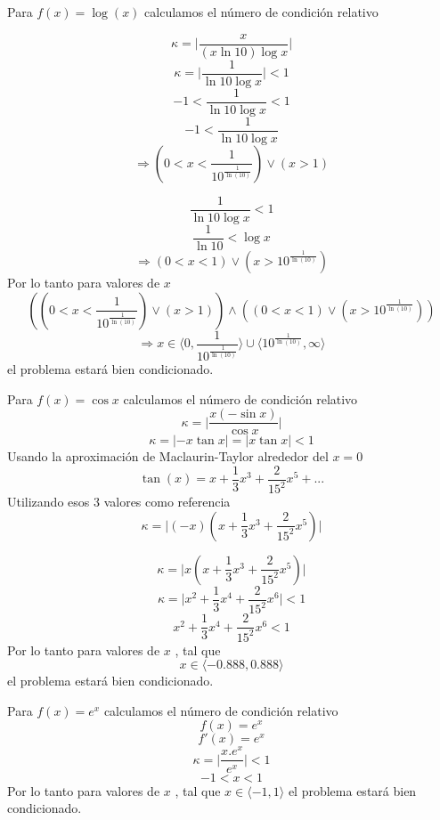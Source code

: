 \documentclass[10pts]{beamer}
\begin{document}
Para $f(x) = \log(x)$ calculamos el número de condición relativo

    \[\kappa = \Bigg| \frac{x}{(x\ln{10})\log{x} }\Bigg|\]
    \[\kappa = \Bigg| \frac{1}{\ln{10}\log{x} }\Bigg| < 1\]
    \[-1<\frac{1}{\ln{10}\log{x} } <1\]
    \[-1<\frac{1}{\ln{10}\log{x} }\]
    \[\Rightarrow   (0<x<\frac{1}{10^{\frac{1}{\ln(10)}}}) \lor (x>1)\]
    

\vspace*{\fill}
%
\newpage

\vspace*{\fill}

    
    \[\frac{1}{\ln{10}\log{x} } <1\]
    \[\frac{1}{\ln{10} } <\log{x}\]
    \[\Rightarrow (0<x<1) \lor (x > 10^{\frac{1}{\ln(10)}})\]
    Por lo tanto para valores de $x$
    \[  ((0<x<\frac{1}{10^{\frac{1}{\ln(10)}}}) \lor (x>1))  \land ((0<x<1) \lor (x > 10^{\frac{1}{\ln(10)}}))\]
    \[\Rightarrow x \in \langle 0,\frac{1}{10^{\frac{1}{\ln(10)}}}\rangle \cup \langle 10^{\frac{1}{\ln(10)}},\infty\rangle\]
    el problema estará bien condicionado.
    
\vspace*{\fill}
%

\newpage
\vspace*{\fill}

Para $f(x) = \cos{x}$ calculamos el número de condición relativo
\[\kappa = \Bigg| \frac{x(-\sin{x})}{\cos{x}} \Bigg|\]
\[\kappa = |-x \tan x |=|x \tan x |<1\]
Usando la aproximación de Maclaurin-Taylor alrededor del $x=0$
\[\tan(x) = x + \frac{1}{3}x^3+\frac{2}{15^2}x^5+...\]
Utilizando esos 3 valores como referencia
\[\kappa= \big|(-x)(x + \frac{1}{3}x^3+\frac{2}{15^2}x^5)\big|\]


\vspace*{\fill}
\newpage
\vspace*{\fill}

\[\kappa= \big|x(x + \frac{1}{3}x^3+\frac{2}{15^2}x^5)\big|\]
\[\kappa= \big|x^2+\frac{1}{3}x^4+\frac{2}{15^2}x^6\big|<1\]
\[x^2+\frac{1}{3}x^4+\frac{2}{15^2}x^6<1\]
Por lo tanto para valores de $x$ , tal que 
\[ x \in \langle -0.888,0.888 \rangle \]
el problema estará bien condicionado.

\vspace*{\fill}


\newpage
\vspace*{\fill}
Para $f(x) = e^x$ calculamos el número de condición relativo
\[f(x)=e^x\]
\[f'(x)=e^x\]
\[\kappa = \Bigg| \frac{x.e^x}{e^x} \Bigg|<1\]
\[-1<x<1\]
Por lo tanto para valores de $x$ , tal que $x \in \langle -1,1 \rangle$ el problema estará bien condicionado.
\end{document}
